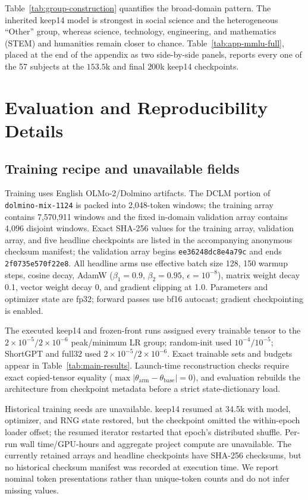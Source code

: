 

Table~\ref{tab:group-construction} quantifies the broad-domain pattern. The
inherited keep14 model is strongest in social science and the heterogeneous
``Other'' group, whereas science, technology, engineering, and mathematics
(STEM) and humanities remain closer to chance.
Table~\ref{tab:app-mmlu-full}, placed at the
end of the appendix as two side-by-side panels, reports every one of the 57
subjects at the $153.5$k and final $200$k keep14 checkpoints.

\section{Evaluation and Reproducibility Details}
\label{app:repro}

\subsection{Training recipe and unavailable fields}
Training uses English OLMo-2/Dolmino artifacts. The DCLM portion of
\texttt{dolmino-mix-1124} is packed into 2,048-token windows; the training array
contains 7,570,911 windows and the fixed in-domain validation array contains
4,096 disjoint windows. Exact SHA-256 values for the training array, validation array, and five
headline checkpoints are listed in the accompanying anonymous checksum
manifest; the validation array begins \texttt{ee36248dc8e4a79c} and ends
\texttt{2f0735e570f22e8}. All headline arms use effective
batch size 128, 150 warmup steps, cosine decay, AdamW
($\beta_1{=}0.9$, $\beta_2{=}0.95$, $\epsilon{=}10^{-8}$), matrix weight decay
0.1, vector weight decay 0, and gradient clipping at 1.0. Parameters and
optimizer state are fp32; forward passes use bf16 autocast; gradient
checkpointing is enabled.

The executed keep14 and frozen-front runs assigned every trainable tensor to
the $2\times10^{-5}/2\times10^{-6}$ peak/minimum LR group; random-init used
$10^{-4}/10^{-5}$; ShortGPT and full32 used
$2\times10^{-5}/2\times10^{-6}$. Exact trainable sets and budgets appear in
Table~\ref{tab:main-results}. Launch-time reconstruction checks require exact
copied-tensor equality ($\max|\theta_{\mathrm{arm}}-\theta_{\mathrm{base}}|=0$),
and evaluation rebuilds the architecture from checkpoint metadata before a
strict state-dictionary load.

Historical training seeds are unavailable. keep14 resumed at 34.5k with model,
optimizer, and RNG state restored, but the checkpoint omitted the within-epoch
loader offset; the resumed iterator restarted that epoch's distributed shuffle.
Per-run wall time/GPU-hours and aggregate project compute are unavailable.
The currently retained arrays and headline checkpoints have SHA-256 checksums,
but no historical checksum manifest was recorded at execution time. We report nominal token presentations rather than unique-token counts
and do not infer missing values.


